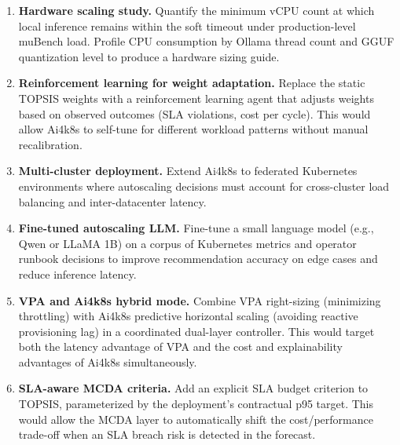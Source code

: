 \begin{enumerate}
  \item \textbf{Hardware scaling study.} Quantify the minimum vCPU count at
  which local inference remains within the soft timeout under production-level
  muBench load. Profile CPU consumption by Ollama thread count and GGUF
  quantization level to produce a hardware sizing guide.

  \item \textbf{Reinforcement learning for weight adaptation.} Replace the
  static TOPSIS weights with a reinforcement learning agent that adjusts
  weights based on observed outcomes (SLA violations, cost per cycle). This
  would allow Ai4k8s to self-tune for different workload patterns without
  manual recalibration.

  \item \textbf{Multi-cluster deployment.} Extend Ai4k8s to federated
  Kubernetes environments where autoscaling decisions must account for
  cross-cluster load balancing and inter-datacenter latency.

  \item \textbf{Fine-tuned autoscaling LLM.} Fine-tune a small language model
  (e.g., Qwen or LLaMA 1B) on a corpus of Kubernetes metrics and operator
  runbook decisions to improve recommendation accuracy on edge cases and reduce
  inference latency.

  \item \textbf{VPA and Ai4k8s hybrid mode.} Combine VPA right-sizing
  (minimizing throttling) with Ai4k8s predictive horizontal scaling (avoiding
  reactive provisioning lag) in a coordinated dual-layer controller. This
  would target both the latency advantage of VPA and the cost and explainability
  advantages of Ai4k8s simultaneously.

  \item \textbf{SLA-aware MCDA criteria.} Add an explicit SLA budget criterion
  to TOPSIS, parameterized by the deployment's contractual p95 target. This
  would allow the MCDA layer to automatically shift the cost/performance
  trade-off when an SLA breach risk is detected in the forecast.
\end{enumerate}
